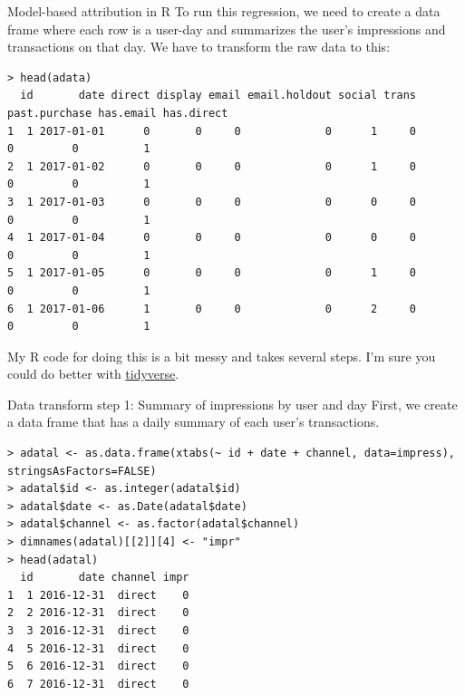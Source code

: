 \documentclass[10pt, aspectratio=169]{beamer}
\begin{document}
\begin{frame}[fragile]{Model-based attribution in R}
To run this regression, we need to create a data frame where each row is a user-day and summarizes the user's impressions and transactions on that day. We have to transform the raw data to this: 
\footnotesize
\begin{lstlisting}[basicstyle=\tiny\ttfamily]
> head(adata)
  id       date direct display email email.holdout social trans past.purchase has.email has.direct
1  1 2017-01-01      0       0     0             0      1     0             0         0          1
2  1 2017-01-02      0       0     0             0      1     0             0         0          1
3  1 2017-01-03      0       0     0             0      0     0             0         0          1
4  1 2017-01-04      0       0     0             0      0     0             0         0          1
5  1 2017-01-05      0       0     0             0      1     0             0         0          1
6  1 2017-01-06      1       0     0             0      2     0             0         0          1
\end{lstlisting}
My R code for doing this is a bit messy and takes several steps. I'm sure you could do better with \href{https://blog.rstudio.org/2016/09/15/tidyverse-1-0-0/}{tidyverse}.
\end{frame}

\begin{frame}[fragile]{Data transform step 1: Summary of impressions by user and day}
\footnotesize
First, we create a data frame that has a daily summary of each user's transactions. 
\begin{lstlisting}[basicstyle=\tiny\ttfamily]
> adatal <- as.data.frame(xtabs(~ id + date + channel, data=impress), stringsAsFactors=FALSE)
> adatal$id <- as.integer(adatal$id)
> adatal$date <- as.Date(adatal$date)
> adatal$channel <- as.factor(adatal$channel)
> dimnames(adatal)[[2]][4] <- "impr"
> head(adatal)
  id       date channel impr
1  1 2016-12-31  direct    0
2  2 2016-12-31  direct    0
3  3 2016-12-31  direct    0
4  5 2016-12-31  direct    0
5  6 2016-12-31  direct    0
6  7 2016-12-31  direct    0
\end{lstlisting}
\end{frame}
\end{document}
